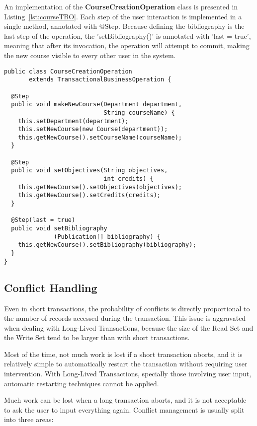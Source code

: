 \documentclass{llncs}
\begin{document}
An implementation of the {\bf CourseCreationOperation} class is
presented in Listing~\ref{lst:courseTBO}. Each step of the user
interaction is implemented in a single method, annotated with
@Step. Because defining the bibliography is the last step of the
operation, the 'setBibliography()' is annotated with 'last = true',
meaning that after its invocation, the operation will attempt to
commit, making the new course visible to every other user in the
system.

\begin{lstlisting}[float]
public class CourseCreationOperation 
       extends TransactionalBusinessOperation {    

  @Step
  public void makeNewCourse(Department department,
                            String courseName) {
    this.setDepartment(department);
    this.setNewCourse(new Course(department));
    this.getNewCourse().setCourseName(courseName);
  }

  @Step
  public void setObjectives(String objectives,
                            int credits) {
    this.getNewCourse().setObjectives(objectives);
    this.getNewCourse().setCredits(credits);
  }

  @Step(last = true)
  public void setBibliography
              (Publication[] bibliography) {
    this.getNewCourse().setBibliography(bibliography);
  }
}
\end{lstlisting}

\subsection{Conflict Handling}

Even in short transactions, the probability of conflicts is directly
proportional to the number of records accessed during the
transaction. This issue is aggravated when dealing with Long-Lived
Transactions, because the size of the Read Set and the Write Set tend to
be larger than with short transactions.

Most of the time, not much work is lost if a short transaction aborts,
and it is relatively simple to automatically restart the transaction
without requiring user intervention. With Long-Lived Transactions,
specially those involving user input, automatic restarting techniques
cannot be applied.

Much work can be lost when a long transaction aborts, and it is not
acceptable to ask the user to input everything again. Conflict
management is usually split into three areas:
\end{document}
